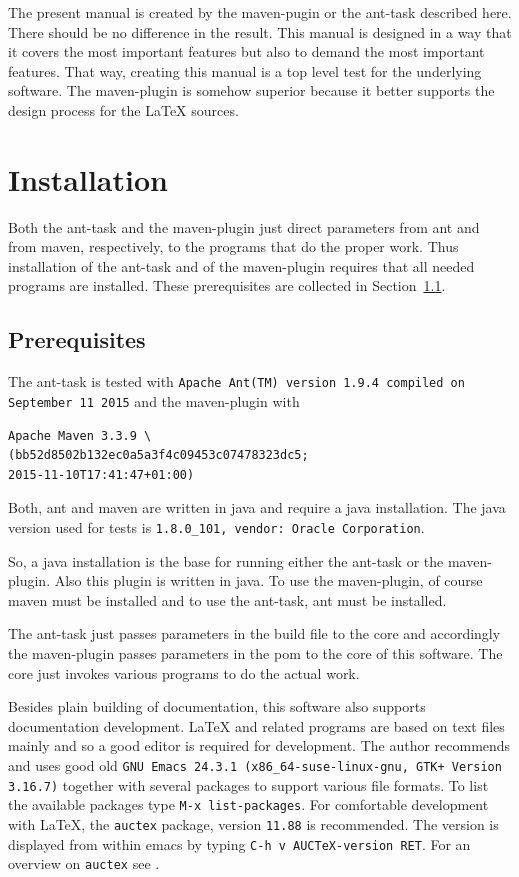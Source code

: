 \documentclass[12pt]{book}
\begin{document}
The present manual is created by the maven-pugin or the ant-task 
described here. 
There should be no difference in the result. 
This manual is designed in a way that it covers the most important features 
but also to demand the most important features. 
That way, creating this manual is a top level test 
for the underlying software. 
The maven-plugin is somehow superior 
because it better supports the design process for the \LaTeX{} sources. 



\chapter{Installation}

Both the ant-task and the maven-plugin just direct parameters 
from ant and from maven, respectively, 
to the programs that do the proper work. 
Thus installation of the ant-task and of the maven-plugin 
requires that all needed programs are installed. 
These prerequisites are collected in Section~\ref{sec:prerequisites}. 

\section{Prerequisites}\label{sec:prerequisites}

The ant-task is tested with 
{\tt Apache Ant(TM) version 1.9.4 compiled on September 11 2015}
and the maven-plugin with 
%
\begin{verbatim}
Apache Maven 3.3.9 \
(bb52d8502b132ec0a5a3f4c09453c07478323dc5; 
2015-11-10T17:41:47+01:00)
\end{verbatim}
%
Both, ant and maven are written in java and require a java installation. 
The java\index{java} version used for tests 
is {\tt 1.8.0\_101, vendor: Oracle Corporation}. 


So, a java installation is the base for running either the ant-task 
or the maven-plugin. 
Also this plugin is written in java. 
To use the maven-plugin, of course maven must be installed 
and to use the ant-task, ant must be installed. 

The ant-task just passes parameters in the build file to the core 
and accordingly the maven-plugin passes parameters in the pom 
to the core of this software. 
The core just invokes various programs to do the actual work. 

Besides plain building of documentation, 
this software also supports documentation development. 
\LaTeX{} and related programs are based on text files mainly 
and so a good editor is required for development. 
The author recommends and uses good old 
{\tt GNU Emacs 24.3.1 (x86\_64-suse-linux-gnu, GTK+ Version 3.16.7)} 
together with several packages to support 
various file formats. 
To list the available packages type 
{\tt M-x list-packages}. 
For comfortable development with \LaTeX, 
the {\tt auctex} package, version {\tt 11.88} is recommended. 
The version is displayed from within emacs 
by typing {\tt C-h v AUCTeX-version RET}. 
For an overview on {\tt auctex} see \cite{AucTeX}. 
\end{document}
